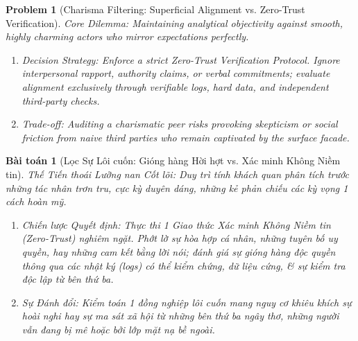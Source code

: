 \documentclass{article}
\newtheorem{problem}{Problem}
\newtheorem{baitoan}{Bài toán}
\begin{document}
\begin{problem}[Charisma Filtering: Superficial Alignment vs. Zero-Trust Verification]
	\emph{Core Dilemma:} Maintaining analytical objectivity against smooth, highly charming actors who mirror expectations perfectly.
	\begin{enumerate}[label=(\roman*)]
		\item \emph{Decision Strategy:} Enforce a strict \textit{Zero-Trust Verification Protocol}. Ignore interpersonal rapport, authority claims, or verbal commitments; evaluate alignment exclusively through verifiable logs, hard data, and independent third-party checks.
		\item \emph{Trade-off:} Auditing a charismatic peer risks provoking skepticism or social friction from naive third parties who remain captivated by the surface facade.
	\end{enumerate}
\end{problem}
\begin{baitoan}[Lọc Sự Lôi cuốn: Gióng hàng Hời hợt vs. Xác minh Không Niềm tin]
	\emph{Thế Tiến thoái Lưỡng nan Cốt lõi:} Duy trì tính khách quan phân tích trước những tác nhân trơn tru, cực kỳ duyên dáng, những kẻ phản chiếu các kỳ vọng 1 cách hoàn mỹ.
	\begin{enumerate}[label=(\roman*)]
		\item \emph{Chiến lược Quyết định:} Thực thi 1 \textit{Giao thức Xác minh Không Niềm tin (Zero-Trust)} nghiêm ngặt. Phớt lờ sự hòa hợp cá nhân, những tuyên bố uy quyền, hay những cam kết bằng lời nói; đánh giá sự gióng hàng độc quyền thông qua các nhật ký (logs) có thể kiểm chứng, dữ liệu cứng, \& sự kiểm tra độc lập từ bên thứ ba.
		\item \emph{Sự Đánh đổi:} Kiểm toán 1 đồng nghiệp lôi cuốn mang nguy cơ khiêu khích sự hoài nghi hay sự ma sát xã hội từ những bên thứ ba ngây thơ, những người vẫn đang bị mê hoặc bởi lớp mặt nạ bề ngoài.
	\end{enumerate}
\end{baitoan}
\end{document}
